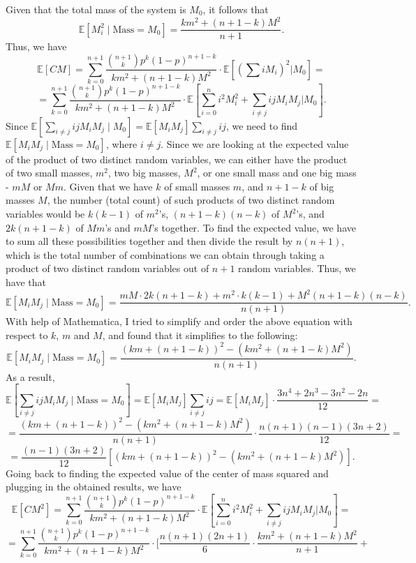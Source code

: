 \documentclass[11pt, twoside, reqno]{book}
\newcommand{\E}{\mathbb{E}}
\begin{document}
Given that the total mass of the system is $M_{0}$, it follows that 
$$\E[M_{i}^{2} \mid \text{Mass} = M_{0}]=\frac{km^{2}+(n+1-k)M^{2}}{n+1}.$$
Thus, we have
$$\E[CM] =  \sum_{k=0}^{n+1} \frac{\binom{n+1}{k}p^{k}(1-p)^{n+1-k}}{km^{2}+(n+1-k)M^2}\cdot \E\left[ \left(\sum iM_{i}\right)^2 \bigg| M_{0} \right] = $$
$$=\sum_{k=0}^{n+1} \frac{\binom{n+1}{k}p^{k}(1-p)^{n+1-k}}{km^{2}+(n+1-k)M^2}\cdot \E\left[ \sum_{i=0}^{n} i^{2}M_{i}^{2} + \sum_{i \neq j} ijM_{i}M_{j} \bigg| M_{0} \right].$$
Since $\E\left[\sum_{i\neq j}ij M_{i}M_{j} \mid M_{0}\right]=\E\left[ M_{i}M_{j}\right]\sum_{i\neq j}ij$, we need to find $\E\left[M_{i}M_{j} \mid \text{Mass}=M_{0} \right]$, where $i \neq j$. Since we are looking at the expected value of the product of two distinct random variables, we can either have the product of two small masses, $m^2$, two big masses, $M^2$, or one small mass and one big mass - $mM$ or $Mm$. Given that we have $k$ of small masses $m$, and $n+1-k$ of big masses $M$, the number (total count) of such products of two distinct random variables would be $k(k-1)$ of $m^2$'s, $(n+1-k)(n-k)$ of $M^2$'s, and $2k(n+1-k)$ of $Mm$'s and $mM$'s together. To find the expected value, we have to sum all these possibilities together and then divide the result by $n(n+1)$, which is the total number of combinations we can obtain through taking a product of two distinct random variables out of $n+1$ random variables. Thus, we have that
$$\E[M_{i}M_{j} \mid \text{Mass}=M_{0}] = \frac{mM\cdot 2k(n+1-k)+m^{2}\cdot k(k-1)+M^{2}(n+1-k)(n-k)}{n(n+1)}.$$
With help of Mathematica, I tried to simplify and order the above equation with respect to $k$, $m$ and $M$, and found that it simplifies to the following:
$$\E[M_{i}M_{j} \mid \text{Mass}=M_{0}] = \frac{(km+(n+1-k))^{2}-(km^{2}+(n+1-k)M^{2})}{n(n+1)}.$$
As a result,
$$\E\left[\sum_{i\neq j}ij M_{i}M_{j} \mid \text{Mass} = M_{0}\right]=\E\left[ M_{i}M_{j}\right]\sum_{i\neq j}ij=\E\left[ M_{i}M_{j}\right] \cdot \frac{3n^{4}+2n^{3}-3n^{2}-2n}{12}=$$
$$=\frac{(km+(n+1-k))^{2}-(km^{2}+(n+1-k)M^{2})}{n(n+1)} \cdot \frac{n(n+1)(n-1)(3n+2)}{12}=$$
$$=\frac{(n-1)(3n+2)}{12} \left[(km+(n+1-k))^{2}-(km^{2}+(n+1-k)M^{2})\right].$$
Going back to finding the expected value of the center of mass squared and plugging in the obtained results, we have
$$\E[CM^{2}] =  \sum_{k=0}^{n+1} \frac{\binom{n+1}{k}p^{k}(1-p)^{n+1-k}}{km^{2}+(n+1-k)M^2}\cdot \E\left[ \sum_{i=0}^{n} i^{2}M_{i}^{2} + \sum_{i \neq j} ijM_{i}M_{j} \bigg| M_{0} \right] = $$
$$=\sum_{k=0}^{n+1} \frac{\binom{n+1}{k}p^{k}(1-p)^{n+1-k}}{km^{2}+(n+1-k)M^2}\cdot \bigg[ \frac{n(n+1)(2n+1)}{6} \cdot \frac{km^{2}+(n+1-k)M^{2}}{n+1}+$$
\end{document}
